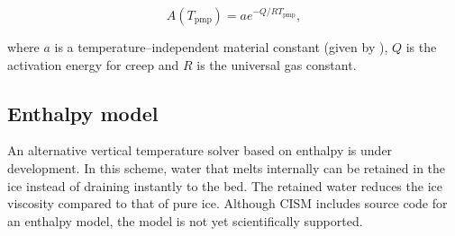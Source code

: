 \begin{equation}
  \label{gliss.eq.arrhenius}
  A(T_{\mathrm{pmp}})=a e^{-Q/RT_{\mathrm{pmp}}},
\end{equation}

\noindent
where $a$ is a temperature--independent material constant (given by \citet{PatersonBudd:1982}),
$Q$ is the activation energy for creep and $R$ is the universal gas constant.

\subsection{Enthalpy model}

An alternative vertical temperature solver based on enthalpy is under development.
In this scheme, water that melts internally can be retained in the ice
instead of draining instantly to the bed. The retained water reduces the ice
viscosity compared to that of pure ice. Although CISM includes source code
for an enthalpy model, the model is not yet scientifically supported.


